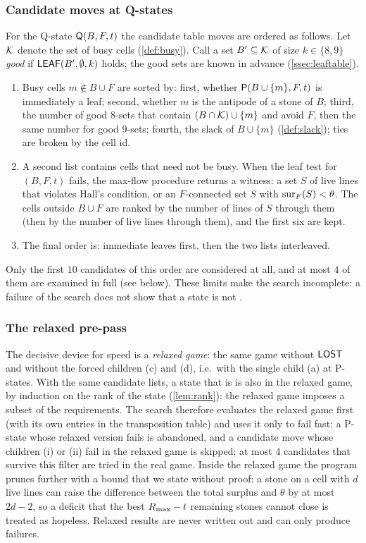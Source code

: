 \subsubsection*{Candidate moves at Q-states}
For the Q-state $\mathsf{Q}(B,F,t)$ the candidate table moves are ordered as follows. Let
$\mathcal{K}$ denote the set of busy cells (\cref{def:busy}). Call a set $B'\subseteq\mathcal{K}$ of size $k\in\{8,9\}$
\emph{good} if $\mathsf{LEAF}(B',\emptyset,k)$ holds; the good sets are known in advance (\cref{ssec:leaftable}).
\begin{enumerate}[label=(\arabic*),leftmargin=2.2em]
\item Busy cells $m\notin B\cup F$ are sorted by: first, whether $\mathsf{P}(B\cup\{m\},F,t)$ is immediately a
  leaf; second, whether $m$ is the antipode of a stone of $B$; third, the number of good $8$-sets that
  contain $(B\cap\mathcal{K})\cup\{m\}$ and avoid $F$, then the same number for good $9$-sets; fourth, the slack
  of $B\cup\{m\}$ (\cref{def:slack}); ties are broken by the cell id.
\item A second list contains cells that need not be busy. When the leaf test for $(B,F,t)$ fails, the
  max-flow procedure returns a witness: a set $S$ of live lines that violates Hall's condition, or an
  $F$-connected set $S$ with $\operatorname{sur}_F(S)<\theta$. The cells outside $B\cup F$ are ranked by the number of
  lines of $S$ through them (then by the number of live lines through them), and the first six are kept.
\item The final order is: immediate leaves first, then the two lists interleaved.
\end{enumerate}
Only the first $10$ candidates of this order are considered at all, and at most $4$ of them are examined in
full (see below). These limits make the search incomplete: a failure of the search does not show that a
state is not \WON.

\subsubsection*{The relaxed pre-pass}
The decisive device for speed is a \emph{relaxed game}: the same game without $\mathsf{LOST}$ and without the
forced children (c) and (d), i.e.\ with the single child (a) at P-states. With the same candidate lists, a
state that is \WON{} is also \WON{} in the relaxed game, by induction on the rank of the state
(\cref{lem:rank}): the relaxed game imposes a subset of the requirements. The search therefore evaluates
the relaxed game
first (with its own entries in the transposition table) and uses it only to fail fast: a P-state whose
relaxed version fails is abandoned, and a candidate move whose children (i) or (ii) fail in the relaxed
game is skipped; at most $4$ candidates that survive this filter are tried in the real game. Inside the
relaxed game the program prunes further with a bound that we state without proof: a stone on a cell with
$d$ live lines can raise the difference
between the total surplus and $\theta$ by at most $2d-2$, so a deficit that the best $R_{\max}-t$ remaining
stones cannot close is treated as hopeless. Relaxed results are never written out and can only produce
failures.

